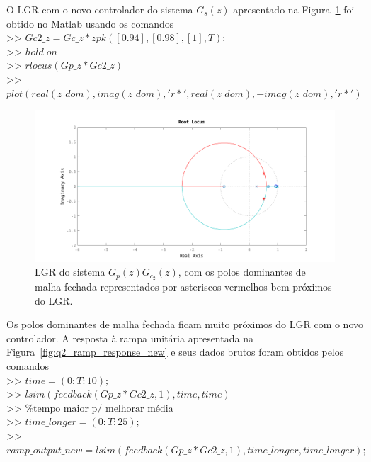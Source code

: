 \documentclass{article}
\begin{document}
{        {O LGR com o novo controlador do sistema $G_s(z)$ apresentado na
        Figura~\ref{fig:q2_lgr_quicker} foi obtido no Matlab usando os comandos\\
        >> $ Gc2\_z = Gc\_z * zpk([0.94], [0.98], [1], T); $\\
        >> $ hold \; on $\\
        >> $ rlocus(Gp\_z * Gc2\_z) $\\
        >> $ plot(real(z\_dom),imag(z\_dom),'r*',real(z\_dom),-imag(z\_dom),'r*') $ }\\

        \begin{figure}[H]
           \centering
                \includegraphics[width=.8\linewidth]{images/q2_rlocus_quicker.png}
                \caption{LGR do sistema $G_p(z)G_{c_2}(z)$, com os polos
                    dominantes de malha fechada representados por asteriscos
                    vermelhos bem próximos do LGR.}
                \label{fig:q2_lgr_quicker}
        \end{figure}

        {Os polos dominantes de malha fechada ficam muito próximos do LGR com
            o novo controlador. A resposta à rampa unitária apresentada na
            Figura~\ref{fig:q2_ramp_response_new} e seus dados brutos foram obtidos
            pelos comandos\\
        >> $ time = (0:T:10); $\\
        >> $ lsim(feedback(Gp\_z * Gc2\_z, 1), time, time) $\\
        >> $ \text{\% tempo maior p/ melhorar média} $\\
        >> $ time\_longer = (0:T:25); $\\
        >> $ ramp\_output\_new = lsim(feedback(Gp\_z * Gc2\_z, 1), time\_longer, time\_longer); $ }\\

}
\end{document}
